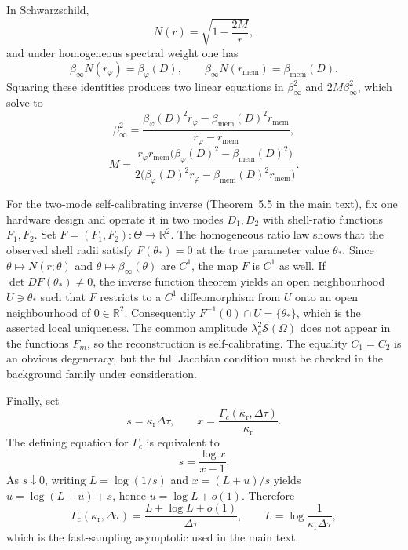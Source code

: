 \documentclass[11pt]{amsart}
\numberwithin{equation}{section}
\theoremstyle{remark}
\newcommand{\RR}{\mathbb{R}}
\begin{document}
In Schwarzschild,
\[
N(r)=\sqrt{1-\frac{2M}{r}},
\]
and under homogeneous spectral weight one has
\[
\beta_\infty N(r_{\varphi})=\beta_{\varphi}(D),
\qquad
\beta_\infty N(r_{\mathrm{mem}})=\beta_{\mathrm{mem}}(D).
\]
Squaring these identities produces two linear equations in $\beta_\infty^2$ and $2M\beta_\infty^2$, which solve to
\begin{equation}\label{eq:supp-beta-infty}
\beta_\infty^2=
\frac{\beta_{\varphi}(D)^2r_{\varphi}-\beta_{\mathrm{mem}}(D)^2r_{\mathrm{mem}}}
{r_{\varphi}-r_{\mathrm{mem}}},
\end{equation}
\begin{equation}\label{eq:supp-mass}
M=
\frac{r_{\varphi}r_{\mathrm{mem}}\bigl(\beta_{\varphi}(D)^2-\beta_{\mathrm{mem}}(D)^2\bigr)}
{2\bigl(\beta_{\varphi}(D)^2r_{\varphi}-\beta_{\mathrm{mem}}(D)^2r_{\mathrm{mem}}\bigr)}.
\end{equation}

For the two-mode self-calibrating inverse (Theorem~5.5 in the main text), fix one hardware design and operate it in two modes $D_1,D_2$ with shell-ratio functions $F_1,F_2$. Set $F=(F_1,F_2):\Theta\to\RR^2$. The homogeneous ratio law shows that the observed shell radii satisfy $F(\theta_*)=0$ at the true parameter value $\theta_*$. Since $\theta\mapsto N(r;\theta)$ and $\theta\mapsto\beta_\infty(\theta)$ are $C^1$, the map $F$ is $C^1$ as well. If $\det DF(\theta_*)\neq0$, the inverse function theorem \cite{KrantzParks2002} yields an open neighbourhood $U\ni\theta_*$ such that $F$ restricts to a $C^1$ diffeomorphism from $U$ onto an open neighbourhood of $0\in\RR^2$. Consequently $F^{-1}(0)\cap U=\{\theta_*\}$, which is the asserted local uniqueness. The common amplitude $\lambda_c^2\mathcal S(\Omega)$ does not appear in the functions $F_m$, so the reconstruction is self-calibrating. The equality $C_1=C_2$ is an obvious degeneracy, but the full Jacobian condition must be checked in the background family under consideration.

Finally, set
\[
s=\kappa_{\mathrm r}\Delta\tau,
\qquad
x=\frac{\Gamma_c(\kappa_{\mathrm r},\Delta\tau)}{\kappa_{\mathrm r}}.
\]
The defining equation for $\Gamma_c$ is equivalent to
\[
s=\frac{\log x}{x-1}.
\]
As $s\downarrow0$, writing $L=\log(1/s)$ and $x=(L+u)/s$ yields $u=\log(L+u)+s$, hence $u=\log L+o(1)$. Therefore
\begin{equation}\label{eq:supp-fast-gammac}
\Gamma_c(\kappa_{\mathrm r},\Delta\tau)
=
\frac{L+\log L+o(1)}{\Delta\tau},
\qquad
L=\log\frac{1}{\kappa_{\mathrm r}\Delta\tau},
\end{equation}
which is the fast-sampling asymptotic used in the main text.


\end{document}
